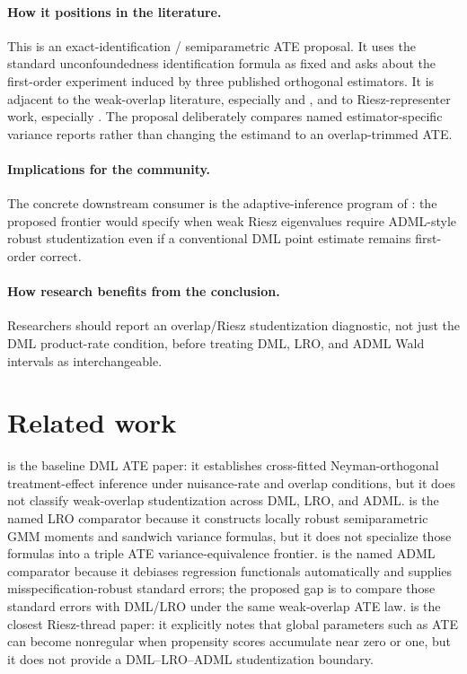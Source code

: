 \documentclass[11pt]{article}
\theoremstyle{definition}
\theoremstyle{plain}
\theoremstyle{remark}
\begin{document}
\paragraph{How it positions in the literature.}
This is an exact-identification / semiparametric ATE proposal.  It uses the standard unconfoundedness identification formula as fixed and asks about the first-order experiment induced by three published orthogonal estimators.  It is adjacent to the weak-overlap literature, especially \citet{CrumpHotzImbensMitnik2009} and \citet{HongLeungLi2020}, and to Riesz-representer work, especially \citet{ChernozhukovNeweySingh2022RR}.  The proposal deliberately compares named estimator-specific variance reports rather than changing the estimand to an overlap-trimmed ATE.

\paragraph{Implications for the community.}
The concrete downstream consumer is the adaptive-inference program of \citet{ChernozhukovNeweySingh2022RR}: the proposed frontier would specify when weak Riesz eigenvalues require ADML-style robust studentization even if a conventional DML point estimate remains first-order correct.

\paragraph{How research benefits from the conclusion.}
Researchers should report an overlap/Riesz studentization diagnostic, not just the DML product-rate condition, before treating DML, LRO, and ADML Wald intervals as interchangeable.

\section{Related work}
\citet{ChernozhukovEtAl2018DML} is the baseline DML ATE paper: it establishes cross-fitted Neyman-orthogonal treatment-effect inference under nuisance-rate and overlap conditions, but it does not classify weak-overlap studentization across DML, LRO, and ADML.  \citet{ChernozhukovEscancianoIchimuraNeweyRobins2022LRO} is the named LRO comparator because it constructs locally robust semiparametric GMM moments and sandwich variance formulas, but it does not specialize those formulas into a triple ATE variance-equivalence frontier.  \citet{ChernozhukovNeweySingh2022ADML} is the named ADML comparator because it debiases regression functionals automatically and supplies misspecification-robust standard errors; the proposed gap is to compare those standard errors with DML/LRO under the same weak-overlap ATE law.  \citet{ChernozhukovNeweySingh2022RR} is the closest Riesz-thread paper: it explicitly notes that global parameters such as ATE can become nonregular when propensity scores accumulate near zero or one, but it does not provide a DML--LRO--ADML studentization boundary.
\end{document}
